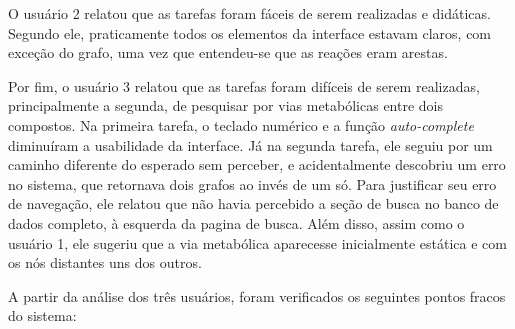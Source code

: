 \indent O usuário 2 relatou que as tarefas foram fáceis de serem realizadas e didáticas. Segundo ele, praticamente todos os elementos da interface estavam claros, com exceção do grafo, uma vez que entendeu-se que as reações eram arestas.

\indent Por fim, o usuário 3 relatou que as tarefas foram difíceis de serem realizadas, principalmente a segunda, de pesquisar por vias metabólicas entre dois compostos. Na primeira tarefa, o teclado numérico e a função \textit{auto-complete} diminuíram a usabilidade da interface. Já na segunda tarefa, ele seguiu por um caminho diferente do esperado sem perceber, e acidentalmente descobriu um erro no sistema, que retornava dois grafos ao invés de um só. Para justificar seu erro de navegação, ele relatou que não havia percebido a seção de busca no banco de dados completo, à esquerda da pagina de busca. Além disso, assim como o usuário 1, ele sugeriu que a via metabólica aparecesse inicialmente estática e com os nós distantes uns dos outros.

\indent A partir da análise dos três usuários, foram verificados os seguintes pontos fracos do sistema:

